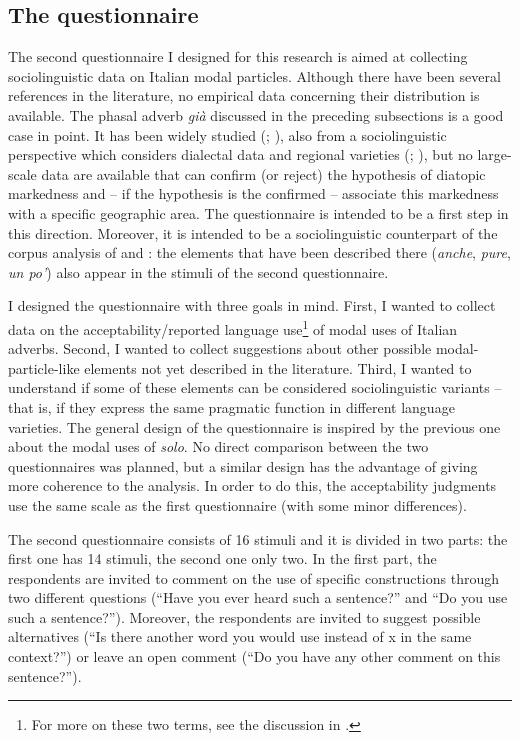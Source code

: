 \subsection{The questionnaire}
\hypertarget{Toc124860684}{}
The second questionnaire I designed for this research is aimed at collecting sociolinguistic data on Italian modal particles. Although there have been several references in the literature, no empirical data concerning their distribution is available. The phasal adverb \textit{già} discussed in the preceding subsections is a good case in point. It has been widely studied (\citealt{BazzanellaEtAl2005}; \citealt{Squartini2013,Squartini2014}), also from a sociolinguistic perspective which considers dialectal data and regional varieties (\citealt{FedrianiMiola2014}; \citealt{Calaresu2015}), but no large-scale data are available that can confirm (or reject) the hypothesis of diatopic markedness and – if the hypothesis is the confirmed – associate this markedness with a specific geographic area. The questionnaire is intended to be a first step in this direction. Moreover, it is intended to be a sociolinguistic counterpart of the corpus analysis of  and : the elements that have been described there (\textit{anche}, \textit{pure}, \textit{un po’}) also appear in the stimuli of the second questionnaire.

I designed the questionnaire with three goals in mind. First, I wanted to collect data on the acceptability/reported language use\footnote{For more on these two terms, see the discussion in .} of modal uses of Italian adverbs. Second, I wanted to collect suggestions about other possible modal-particle-like elements not yet described in the literature. Third, I wanted to understand if some of these elements can be considered sociolinguistic variants – that is, if they express the same pragmatic function in different language varieties. The general design of the questionnaire is inspired by the previous one about the modal uses of \textit{solo}. No direct comparison between the two questionnaires was planned, but a similar design has the advantage of giving more coherence to the analysis. In order to do this, the acceptability judgments use the same scale as the first questionnaire (with some minor differences).

The second questionnaire consists of 16 stimuli and it is divided in two parts: the first one has 14 stimuli, the second one only two. In the first part, the respondents are invited to comment on the use of specific constructions through two different questions (“Have you ever heard such a sentence?” and “Do you use such a sentence?”). Moreover, the respondents are invited to suggest possible alternatives (“Is there another word you would use instead of x in the same context?”) or leave an open comment (“Do you have any other comment on this sentence?”).

